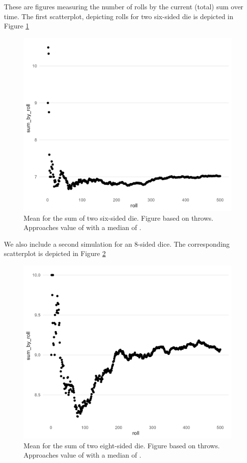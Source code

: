 \documentclass[12pt]{article}
\theoremstyle{definition}
\begin{document}
\newpage

These are figures measuring the number of rolls by the current (total) sum over time. The first scatterplot, depicting rolls for two six-sided die is depicted in Figure \ref{fig:scatter_baseline} 
\begin{figure}[tbh!]
\centering
\includegraphics[width=.8\linewidth]{plot/baseline/lln_plot_baseline.png}
\caption[]{Mean for the sum of two six-sided die. Figure based on throws. Approaches value of with a median of .}
\label{fig:scatter_baseline}
\end{figure}

\newpage

We also include a second simulation for an 8-sided dice. The corresponding scatterplot is depicted in Figure 
\ref{fig:scatter_8side} 
\begin{figure}[tbh!]
\centering
\includegraphics[width=.8\linewidth]{plot/500_8/lln_plot_500_8.png}
\caption[]{Mean for the sum of two eight-sided die. Figure based on throws. Approaches value of with a median of .}
\label{fig:scatter_8side}
\end{figure}
\end{document}
